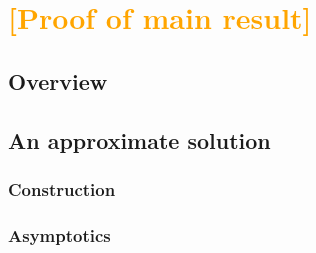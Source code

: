 \documentclass{article}
\theoremstyle{plain}
\newcommand{\R}{\mathbb{R}}
\let\Re\relax
\DeclareMathOperator{\Re}{Re}
\newcommand{\holoL}[1]{\mathcal{H}L^{#1}} %
\newcommand{\expHoloL}[2]{\mathcal{H}L^{#1}_{#2}} %
\begin{document}

\section{\textcolor{orange}{[Proof of main result]}}
\subsection{Overview}
\subsection{An approximate solution}
\subsubsection{Construction}
\subsubsection{Asymptotics}
\end{document}
